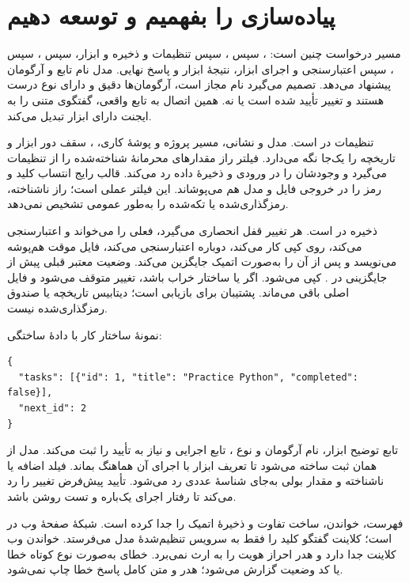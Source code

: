 \chapter{پیاده‌سازی را بفهمیم و توسعه دهیم}

مسیر درخواست چنین است: 
، سپس 
، سپس تنظیمات و ذخیره و ابزار، سپس 
، سپس 
، سپس اعتبارسنجی و اجرای ابزار، نتیجهٔ ابزار و پاسخ نهایی. مدل نام تابع و آرگومان 
 پیشنهاد می‌دهد. 
 تصمیم می‌گیرد نام مجاز است، آرگومان‌ها دقیق و دارای نوع درست هستند و تغییر تأیید شده است یا نه. همین اتصال به تابع واقعی، گفتگوی متنی را به ایجنت دارای ابزار تبدیل می‌کند.

تنظیمات در 
 است. 
 مدل و نشانی، مسیر پروژه و پوشهٔ کاری، 
، سقف دور ابزار و تاریخچه را یک‌جا نگه می‌دارد. فیلتر راز مقدارهای محرمانهٔ شناخته‌شده را از تنظیمات می‌گیرد و وجودشان را در ورودی و ذخیرهٔ داده رد می‌کند. قالب رایج انتساب کلید و رمز را در خروجی فایل و مدل هم می‌پوشاند. این فیلتر عملی است؛ راز ناشناخته، رمزگذاری‌شده یا تکه‌شده را به‌طور عمومی تشخیص نمی‌دهد.

ذخیره در 
 است. هر تغییر قفل انحصاری می‌گیرد، 
 فعلی را می‌خواند و اعتبارسنجی می‌کند، روی کپی کار می‌کند، دوباره اعتبارسنجی می‌کند، فایل موقت هم‌پوشه می‌نویسد و پس از 
 آن را به‌صورت اتمیک جایگزین می‌کند. وضعیت معتبر قبلی پیش از جایگزینی در .
 کپی می‌شود. اگر 
 یا ساختار خراب باشد، تغییر متوقف می‌شود و فایل اصلی باقی می‌ماند. پشتیبان برای بازیابی است؛ دیتابیس تاریخچه یا صندوق رمزگذاری‌شده نیست.

نمونهٔ ساختار کار با دادهٔ ساختگی:

\begin{LTR}
\begin{Verbatim}[breaklines,breakanywhere,fontsize=\small]
{
  "tasks": [{"id": 1, "title": "Practice Python", "completed": false}],
  "next_id": 2
}
\end{Verbatim}
\end{LTR}

تابع 
 توضیح ابزار، نام آرگومان و نوع 
، تابع اجرایی و نیاز به تأیید را ثبت می‌کند. 
 مدل از همان ثبت ساخته می‌شود تا تعریف ابزار با اجرای آن هماهنگ بماند. فیلد اضافه یا ناشناخته و مقدار بولی به‌جای شناسهٔ عددی رد می‌شود. تأیید پیش‌فرض تغییر را رد می‌کند تا رفتار اجرای یک‌باره و تست روشن باشد.

 فهرست، خواندن، ساخت تفاوت و ذخیرهٔ اتمیک را جدا کرده است. شبکهٔ صفحهٔ وب در 
 است؛ کلاینت گفتگو کلید را فقط به سرویس تنظیم‌شدهٔ مدل می‌فرستد. خواندن وب کلاینت جدا دارد و هدر احراز هویت 
 را به ارث نمی‌برد. خطای 
 به‌صورت نوع کوتاه خطا یا کد وضعیت گزارش می‌شود؛ هدر و متن کامل پاسخ خطا چاپ نمی‌شود.

